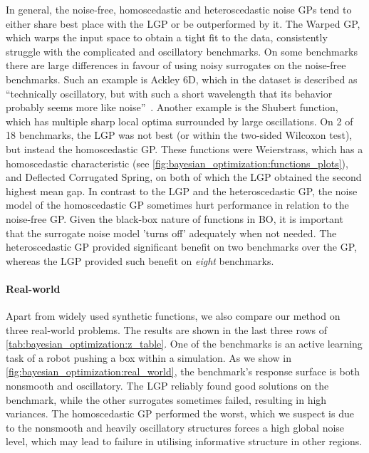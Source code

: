 In general, the noise-free, homoscedastic and heteroscedastic noise GPs tend to either share best place with the LGP or be outperformed by
it.
The Warped GP, which warps the input space to obtain a tight fit to the data, consistently struggle with the complicated and oscillatory benchmarks.
On some benchmarks there are large differences in favour of using noisy surrogates on the noise-free benchmarks.
Such an example is Ackley 6D, which in the dataset is described as \enquote{technically oscillatory, but with such a short wavelength that its behavior probably seems more like noise}~\parencite{mccourt_optimization_2016}.
Another example is the Shubert function, which has multiple sharp local optima surrounded by large oscillations.
On 2 of 18 benchmarks, the LGP was not best (or within the two-sided Wilcoxon test), but instead the homoscedastic GP.
These functions were Weierstrass, which has a homoscedastic characteristic (see \cref{fig:bayesian_optimization:functions_plots}),
and Deflected Corrugated Spring, on both of which the LGP obtained the second highest mean gap.
In contrast to the LGP and the heteroscedastic GP, the noise model of the homoscedastic GP sometimes hurt performance in relation to the noise-free GP.
Given the black-box nature of functions in BO, it is important that the surrogate noise model 'turns off' adequately when not needed.
The heteroscedastic GP provided significant benefit on two benchmarks over the GP,
whereas the LGP provided such benefit on \emph{eight} benchmarks.

\paragraph{Real-world} Apart from widely used synthetic functions,
we also compare our method on three real-world problems.
The results are shown in the last three rows of \cref{tab:bayesian_optimization:z_table}.
One of the benchmarks is an active learning task of a robot pushing a box within a simulation.
As we show in \cref{fig:bayesian_optimization:real_world}, the benchmark's response surface is both nonsmooth and oscillatory.
The LGP reliably found good solutions on the benchmark, while the other surrogates sometimes failed, resulting in high variances.
The homoscedastic GP performed the worst,
which we suspect is due to the nonsmooth and heavily oscillatory structures forces a high global noise level,
which may lead to failure in utilising informative structure in other regions.

